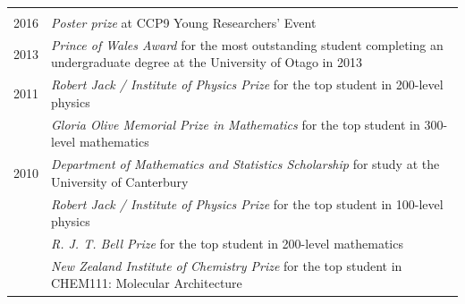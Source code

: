 \documentclass[10pt,a4paper,final]{article}
\begin{document}
\newpage

\begin{tabularx}{\textwidth}{l m{}}
   \rowcolor{seaborn_blue}
   \multicolumn{2}{l}{\large\textcolor{seaborn_bg_grey_half}{\textbf{Awards and Prizes}}}                                                         \\
   {2016} & \textit{Poster prize} at CCP9 Young Researchers' Event                                                                                \\
   {2013} & \textit{Prince of Wales Award} for the most outstanding student completing an undergraduate degree at the University of Otago in 2013 \\
   {2011} & \textit{Robert Jack / Institute of Physics Prize} for the top student in 200-level physics                                            \\
          & \textit{Gloria Olive Memorial Prize in Mathematics} for the top student in 300-level mathematics                                      \\
   {2010} & \textit{Department of Mathematics and Statistics Scholarship} for study at the University of Canterbury                               \\
          & \textit{Robert Jack / Institute of Physics Prize} for the top student in 100-level physics                                            \\
          & \textit{R. J. T. Bell Prize} for the top student in 200-level mathematics                                                             \\
          & \textit{New Zealand Institute of Chemistry Prize} for the top student in CHEM111: Molecular Architecture                              \\
\end{tabularx}
\end{document}
